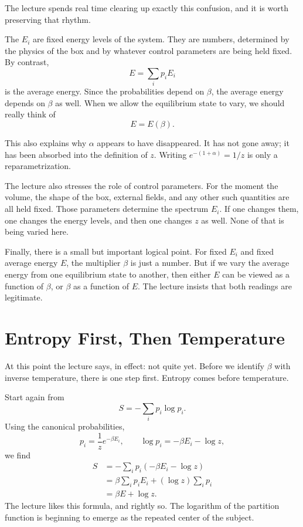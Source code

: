 The lecture spends real time clearing up exactly this confusion, and it is worth preserving that rhythm.

The \(E_i\) are fixed energy levels of the system. They are numbers, determined by the physics of the box and by whatever control parameters are being held fixed. By contrast,
\begin{equation}
E=\sum_i p_i E_i
\end{equation}
is the average energy. Since the probabilities depend on \(\beta\), the average energy depends on \(\beta\) as well. When we allow the equilibrium state to vary, we should really think of
\begin{equation}
E=E(\beta).
\end{equation}

This also explains why \(\alpha\) appears to have disappeared. It has not gone away; it has been absorbed into the definition of \(z\). Writing \(e^{-(1+\alpha)}=1/z\) is only a reparametrization.

The lecture also stresses the role of control parameters. For the moment the volume, the shape of the box, external fields, and any other such quantities are all held fixed. Those parameters determine the spectrum \(E_i\). If one changes them, one changes the energy levels, and then one changes \(z\) as well. None of that is being varied here.

Finally, there is a small but important logical point. For fixed \(E_i\) and fixed average energy \(E\), the multiplier \(\beta\) is just a number. But if we vary the average energy from one equilibrium state to another, then either \(E\) can be viewed as a function of \(\beta\), or \(\beta\) as a function of \(E\). The lecture insists that both readings are legitimate.

\section{Entropy First, Then Temperature}

At this point the lecture says, in effect: not quite yet. Before we identify \(\beta\) with inverse temperature, there is one step first. Entropy comes before temperature.

Start again from
\begin{equation}
S=-\sum_i p_i\log p_i.
\end{equation}
Using the canonical probabilities,
\begin{equation}
p_i=\frac{1}{z}e^{-\beta E_i},
\qquad
\log p_i=-\beta E_i-\log z,
\end{equation}
we find
\begin{align}
S
&=
-\sum_i p_i(-\beta E_i-\log z) \\
&=
\beta\sum_i p_i E_i + (\log z)\sum_i p_i \\
&=
\beta E+\log z.
\end{align}
The lecture likes this formula, and rightly so. The logarithm of the partition function is beginning to emerge as the repeated center of the subject.

